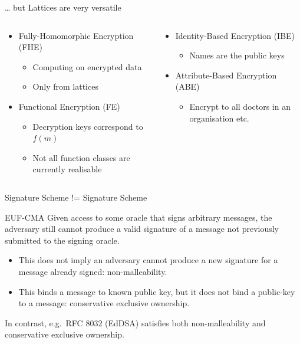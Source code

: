 \documentclass[xcolor=table,10pt,aspectratio=169]{beamer}
\begin{document}
\begin{frame}[label={sec:org78134e8}]{… but Lattices are very versatile}
\begin{columns}[t]
\begin{column}{0.5\columnwidth}
\begin{itemize}
\item Fully-Homomorphic Encryption (FHE)
\begin{itemize}
\item Computing on encrypted data
\item Only from lattices
\end{itemize}

\item Functional Encryption (FE)
\begin{itemize}
\item Decryption keys correspond to \(f(m)\)
\item Not all function classes are currently realisable
\end{itemize}
\end{itemize}
\end{column}

\begin{column}{0.5\columnwidth}
\begin{itemize}
\item Identity-Based Encryption (IBE)
\begin{itemize}
\item Names \alert{are} the public keys
\end{itemize}
\item Attribute-Based Encryption (ABE)
\begin{itemize}
\item Encrypt to all doctors in an organisation etc.
\end{itemize}
\end{itemize}
\end{column}
\end{columns}
\end{frame}

\begin{frame}[label={sec:org9e1f803}]{Signature Scheme != Signature Scheme}
\begin{alertblock}{EUF-CMA}
Given access to some oracle that signs arbitrary messages, the adversary still cannot produce a valid signature of a message not previously submitted to the signing oracle. 
\end{alertblock}

\begin{itemize}
\item This does not imply an adversary cannot produce a new signature for a message already signed: \alert{non-malleability}.
\item This binds a message to known public key, but it does not bind a public-key to a message: \alert{conservative exclusive ownership}.
\end{itemize}

In contrast, e.g. RFC 8032 (EdDSA) satisfies both non-malleability and conservative exclusive ownership.
\end{frame}
\end{document}
